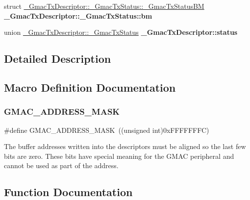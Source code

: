 \begin{DoxyCompactItemize}
\item 
\mbox{\label{group__gmac__defines_ga18aa03b16cc02fa704703ea13c2932ff}} 
struct \mbox{\hyperlink{struct__GmacTxDescriptor_1_1__GmacTxStatus_1_1__GmacTxStatusBM}{\+\_\+\+Gmac\+Tx\+Descriptor\+::\+\_\+\+Gmac\+Tx\+Status\+::\+\_\+\+Gmac\+Tx\+Status\+BM}} {\bfseries \+\_\+\+Gmac\+Tx\+Descriptor\+::\+\_\+\+Gmac\+Tx\+Status\+::bm}
\item 
\mbox{\label{group__gmac__defines_ga69d6da6ae1a2b05306bd5c2153ef1ec4}} 
union \mbox{\hyperlink{union__GmacTxDescriptor_1_1__GmacTxStatus}{\+\_\+\+Gmac\+Tx\+Descriptor\+::\+\_\+\+Gmac\+Tx\+Status}} {\bfseries \+\_\+\+Gmac\+Tx\+Descriptor\+::status}
\end{DoxyCompactItemize}


\subsection{Detailed Description}


\subsection{Macro Definition Documentation}
\mbox{\label{group__gmac__defines_ga206f1c848d30bec082a223d086e7428b}} 
\subsubsection{\texorpdfstring{GMAC\_ADDRESS\_MASK}{GMAC\_ADDRESS\_MASK}}
{\footnotesize\ttfamily \#define G\+M\+A\+C\+\_\+\+A\+D\+D\+R\+E\+S\+S\+\_\+\+M\+A\+SK~((unsigned int)0x\+F\+F\+F\+F\+F\+F\+F\+C)}

The buffer addresses written into the descriptors must be aligned so the last few bits are zero. These bits have special meaning for the G\+M\+AC peripheral and cannot be used as part of the address. 

\subsection{Function Documentation}
\mbox{\label{group__gmac__defines_ga409a1719b06569ad5f4efe03d21ab1dd}} 
